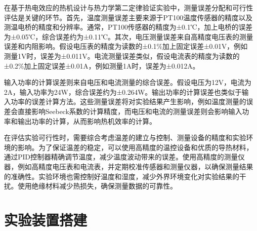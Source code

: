 \documentclass[dvipsnames, svgnames,a4paper,11pt]{article}
\begin{document}
        在基于热电效应的热机设计与热力学第二定律验证实验中，测量误差分配和可行性评估是关键的环节。首先，温度测量误差主要来源于PT100温度传感器的精度以及测温电桥的精度和分辨率。通常，PT100传感器的精度为±0.1℃，加上电桥的误差为±0.05℃，综合误差约为±0.11℃。其次，电压测量误差来自高精度电压表的测量误差和内阻影响。假设电压表的精度为读数的±0.1\%加上固定误差±0.01V，例如测量1V时，误差为±0.011V。电流测量误差类似，假设电流表的精度为读数的±0.2\%加上固定误差±0.01A，例如测量1A时，误差为±0.012A。

        输入功率的计算误差则来自电压和电流测量的综合误差。假设电压为12V，电流为2A，输入功率为24W，综合误差约为±0.264W。输出功率的计算误差也类似于输入功率的误差计算方法。这些测量误差将对实验结果产生影响，例如温度测量的误差会直接影响Seebeck系数的计算精度，而电压和电流的测量误差则会影响输入功率和输出功率的计算，从而影响热机效率的计算。
        
        在评估实验可行性时，需要综合考虑温差的建立与控制、测量设备的精度和实验环境的影响。为了保证温差的稳定，可以使用高精度的温控设备和优质的导热材料，通过PID控制器精确调节温度，减少温度波动带来的误差。使用高精度的测量仪器，例如高精度电压表和电流表，并定期校准传感器和测量仪器，以确保测量结果的准确性。实验环境也需控制好温度和湿度，减少外界环境变化对实验结果的干扰。使用绝缘材料减少热损失，确保测量数据的可靠性。
    



\clearpage
\section{实验装置搭建}


    \begin{figure}[htbp]
        \centering
        \label{fig:热机}
    \end{figure}
\end{document}
